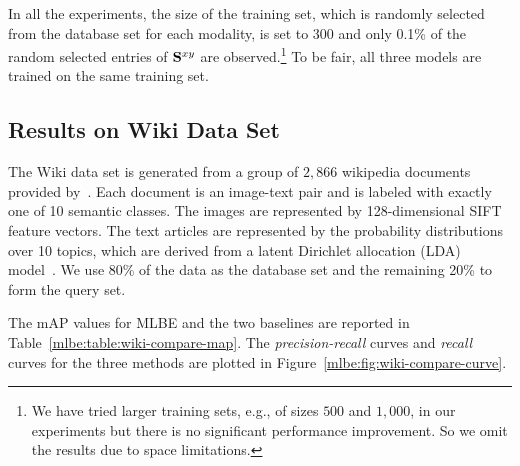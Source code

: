 In all the experiments, the size of the training set, which is randomly selected from the database set for each modality, is set to 300 and only 0.1\% of the random selected entries of $\S^{xy}$ are observed.\footnote{We have tried larger training sets, e.g., of sizes $500$ and $1{,}000$, in our experiments but there is no significant performance improvement. So we omit the results due to space limitations.} To be fair, all three models are trained on the same training set. %

\subsection{Results on \mbox{Wiki} Data Set}
\label{sec:exps:wiki}

The \mbox{Wiki} data set is generated from a group of $2{,}866$ wikipedia documents provided by~\cite{rasiwasia2010mm}. Each document is an image-text pair and is labeled with exactly one of 10 semantic classes. The images are represented by 128-dimensional \mbox{SIFT}~\cite{lowe2004ijcv} feature vectors.  The text articles are represented by the probability distributions over 10 topics, which are derived from a latent Dirichlet allocation (\mbox{LDA}) model~\cite{blei2003jmlr}. We use 80\% of the data as the database set and the remaining 20\% to form the query set.


The \mbox{mAP} values for \mbox{MLBE} and the two baselines are reported in Table~\ref{mlbe:table:wiki-compare-map}.  The \textit{precision-recall} curves and \textit{recall} curves for the three methods are plotted in Figure~\ref{mlbe:fig:wiki-compare-curve}.

